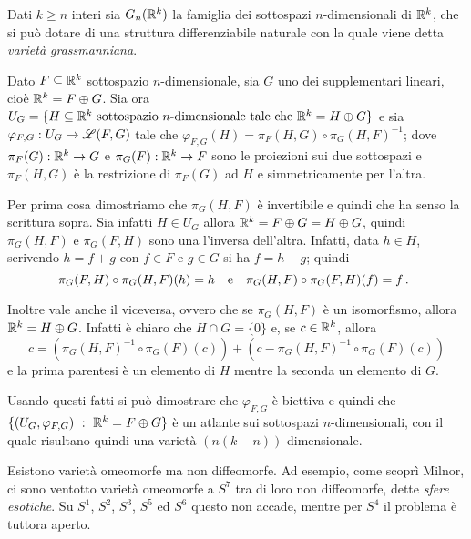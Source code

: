 \begin{example} 
	Dati $k \geq n$ interi sia $G_n(\mathbb R^k)$ la famiglia dei sottospazi $n$-dimensionali di $\mathbb R^k$, che si può dotare di una struttura differenziabile naturale con la quale viene detta \emph{varietà grassmanniana}.
 
	Dato $F \subseteq \mathbb R^k$ sottospazio $n$-dimensionale, sia $G$ uno dei supplementari lineari, cioè $\mathbb R^k=F \oplus G$.
	Sia ora $U_G=\{H\subseteq \mathbb R^k \text{ sottospazio $n$-dimensionale tale che }\mathbb R^k=H \oplus G\}$ e sia $\varphi_{F,G}:U_G \to \mathscr L(F,G)$ tale che $\varphi_{F,G}(H)=\pi_F(H,G) \circ \pi_G(H,F)^{-1}$; dove $\pi_F(G):\mathbb R^k \to G$ e $\pi_G(F):\mathbb R^k \to F$ sono le proiezioni sui due sottospazi e $\pi_F(H,G)$ è la restrizione di $\pi_F(G)$ ad $H$ e simmetricamente per l'altra. 
 
	Per prima cosa dimostriamo che $\pi_G(H,F)$ è invertibile e quindi che ha senso la scrittura sopra.
	Sia infatti $H \in U_G$ allora $\mathbb R^k=F \oplus G=H \oplus G$, quindi $\pi_G(H,F)$ e $\pi_G(F,H)$ sono una l'inversa dell'altra. Infatti, data $h\in H$, scrivendo $h=f+g$ con $f \in F$ e $g \in G$ si ha $f=h-g$; quindi
 \begin{equation*}
 \pi_G(F,H) \circ \pi_G(H,F)(h)=h \quad \text{e} \quad \pi_G(H,F) \circ \pi_G(F,H)(f)=f \, \text{. }
 \end{equation*}
 
 Inoltre vale anche il viceversa, ovvero che se $\pi_G(H,F)$ è un isomorfismo, allora $\mathbb R^k=H \oplus G$. Infatti
 è chiaro che $H \cap G=\{0\}$ e, se $c \in \mathbb R^k$, allora
 \begin{equation*}
 c=(\pi_G(H,F)^{-1} \circ \pi_G(F)(c))+(c-\pi_G(H,F)^{-1} \circ \pi_G(F)(c))
 \end{equation*}
 e la prima parentesi
 è un elemento di $H$ mentre la seconda un elemento di $G$.
 
 Usando questi fatti si può dimostrare che $\varphi_{F,G}$ è biettiva e quindi che $\{(U_G,\varphi_{F,G}) \ :\  \mathbb R^k=F \oplus G \}$ è 
 un atlante sui sottospazi $n$-dimensionali, con il quale risultano quindi una varietà $(n(k-n))$-dimensionale.
 
 \end{example}

 
 \begin{remark} 
  Esistono varietà omeomorfe ma non diffeomorfe. Ad esempio, come scoprì Milnor, ci sono ventotto varietà
  omeomorfe a $S^7$ tra di loro non diffeomorfe, dette \emph{sfere esotiche}. Su $S^1$, $S^2$, $S^3$, $S^5$
  ed $S^6$ questo non accade, mentre per $S^4$ il problema è tuttora aperto.
 \end{remark}
 
